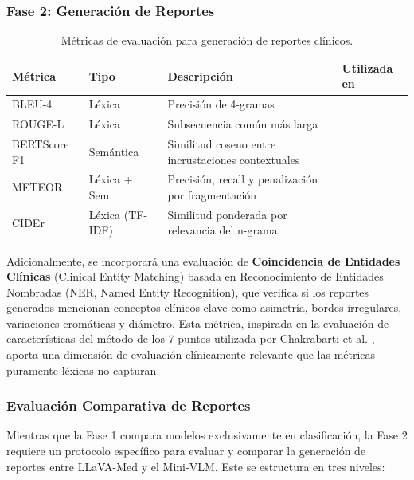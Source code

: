 \documentclass[11pt, a4paper]{article}
\begin{document}
\subsubsection{Fase 2: Generación de Reportes}

\begin{table}[H]
\centering
\caption{Métricas de evaluación para generación de reportes clínicos.}
\label{tab:metricas_gen}
\begin{tabular}{@{}llp{4.5cm}p{4cm}@{}}
\toprule
\textbf{Métrica} & \textbf{Tipo} & \textbf{Descripción} & \textbf{Utilizada en} \\
\midrule
BLEU-4 & Léxica & Precisión de 4-gramas & \cite{yilmaz_dermatollama_2025, zhao_mm-skin_2025} \\
ROUGE-L & Léxica & Subsecuencia común más larga & \cite{yilmaz_dermatollama_2025, chakrabarti_automated_2025, zhao_mm-skin_2025, he_pefomed_2024} \\
BERTScore F1 & Semántica & Similitud coseno entre incrustaciones contextuales & \cite{chakrabarti_automated_2025, zhao_mm-skin_2025} \\
METEOR & Léxica + Sem. & Precisión, recall y penalización por fragmentación & \cite{zhao_mm-skin_2025, he_pefomed_2024} \\
CIDEr & Léxica (TF-IDF) & Similitud ponderada por relevancia del n-grama & \cite{he_pefomed_2024} \\
\bottomrule
\end{tabular}
\end{table}

Adicionalmente, se incorporará una evaluación de \textbf{Coincidencia de Entidades Clínicas} (Clinical Entity Matching) basada en Reconocimiento de Entidades Nombradas (NER, Named Entity Recognition), que verifica si los reportes generados mencionan conceptos clínicos clave como asimetría, bordes irregulares, variaciones cromáticas y diámetro. Esta métrica, inspirada en la evaluación de características del método de los 7 puntos utilizada por Chakrabarti et al. \cite{chakrabarti_automated_2025}, aporta una dimensión de evaluación clínicamente relevante que las métricas puramente léxicas no capturan.

\subsubsection{Evaluación Comparativa de Reportes}

Mientras que la Fase 1 compara modelos exclusivamente en clasificación, la Fase 2 requiere un protocolo específico para evaluar y comparar la generación de reportes entre LLaVA-Med y el Mini-VLM. Este se estructura en tres niveles:
\end{document}
